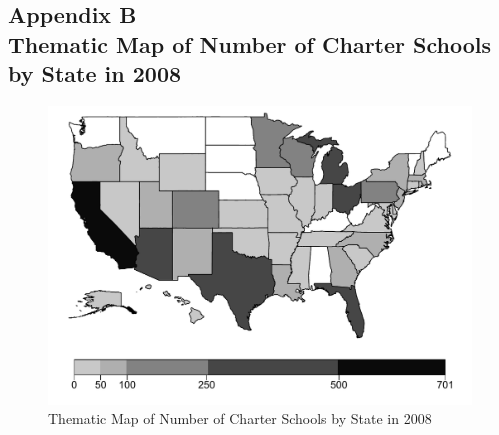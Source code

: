 \documentclass[letterpaper,12p,twoside]{article} %
\begin{document}
\subsection*{Appendix B\\Thematic Map of Number of Charter Schools by State in 2008}
\label{appendixMap}
\begin{figure}[h]
\includegraphics[width=\textwidth]{../Figures/CharterMap.pdf}
\caption{Thematic Map of Number of Charter Schools by State in 2008}
\label{fig:charterMap}
\end{figure}

\newpage
{}
\end{document}
